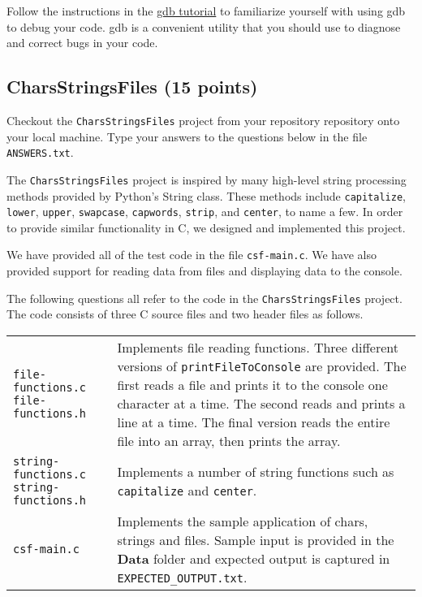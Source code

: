 \documentclass[12pt]{article}
\begin{document}
Follow the instructions in the \href{../resources/gdbtutorial.html}{gdb
tutorial} to familiarize yourself with using gdb to debug your code.  
gdb is a convenient utility that you should use to diagnose and correct 
bugs in your code.

\subsection{CharsStringsFiles (15 points)}

Checkout the \texttt{CharsStringsFiles} project from your repository
repository onto your local machine.  Type your answers to the 
questions below in the file \texttt{ANSWERS.txt}.


The \texttt{CharsStringsFiles} project is inspired by many high-level
string processing methods provided by Python's String class.  These
methods include \texttt{capitalize}, \texttt{lower}, \texttt{upper},
\texttt{swapcase}, \texttt{capwords}, \texttt{strip}, and
\texttt{center}, to name a few.  In order to provide similar
functionality in C, we designed and implemented this project.

We have provided all of the test code in the file \texttt{csf-main.c}.
We have also provided support for reading data from files and
displaying data to the console.

The following questions all refer to the code in the
\texttt{CharsStringsFiles} project.  The code consists of three C
source files and two header files as follows.

\begin{center}
  \begin{longtable}{p{4cm}p{10cm}}
    \texttt{file-functions.c} \newline \texttt{file-functions.h} &
      Implements file reading functions.  Three
      different versions of \texttt{printFileToConsole} are provided.
      The first reads a file and prints it to the console one character
      at a time.  The second reads and prints a line at a time.  The
      final version reads the entire file into an array, then prints
      the array. \\


    \texttt{string-functions.c} \newline  \texttt{string-functions.h} &
    Implements a number of  string functions such as
      \texttt{capitalize} and \texttt{center}. \\


    \texttt{csf-main.c} &
    Implements the sample application of chars,
      strings and files.  Sample input is provided in the
      \textbf{Data} folder and expected output is captured in
      \texttt{EXPECTED\_OUTPUT.txt}.\\
  \end{longtable}
\end{center}
\end{document}
